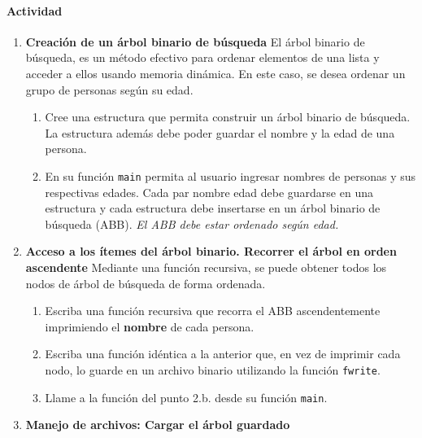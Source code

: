 \documentclass[a4paper,10pt]{article}
\begin{document}
\paragraph{Actividad}
\begin{enumerate}
	\item \textbf{Creación de un árbol binario de búsqueda}
	El árbol binario de búsqueda, es un método efectivo para ordenar elementos de una lista y acceder a ellos usando memoria dinámica.
	En este caso, se desea ordenar un grupo de personas según su edad.

	\begin{enumerate}
		\item Cree una estructura que permita construir un árbol binario de búsqueda. La estructura además debe poder guardar el nombre y la edad de una persona.
		\item En su función \texttt{main} permita al usuario ingresar nombres de personas y sus respectivas edades. Cada par nombre edad debe guardarse en una estructura
			y cada estructura debe insertarse en un árbol binario de búsqueda (ABB). \textit{El ABB debe estar ordenado según edad.}
	\end{enumerate}

	\item \textbf{Acceso a los ítemes del árbol binario. Recorrer el árbol en orden ascendente}
	Mediante una función recursiva, se puede obtener todos los nodos de árbol de búsqueda de forma ordenada.

	\begin{enumerate}
		\item Escriba una función recursiva que recorra el ABB ascendentemente imprimiendo el \textbf{nombre} de cada persona.
		\item Escriba una función idéntica a la anterior que, en vez de imprimir cada nodo, lo guarde en un archivo binario utilizando la función \texttt{fwrite}.
		\item Llame a la función del punto 2.b. desde su función \texttt{main}.
	\end{enumerate}

	\item \textbf{Manejo de archivos: Cargar el árbol guardado}
	

\end{enumerate}
\end{document}
